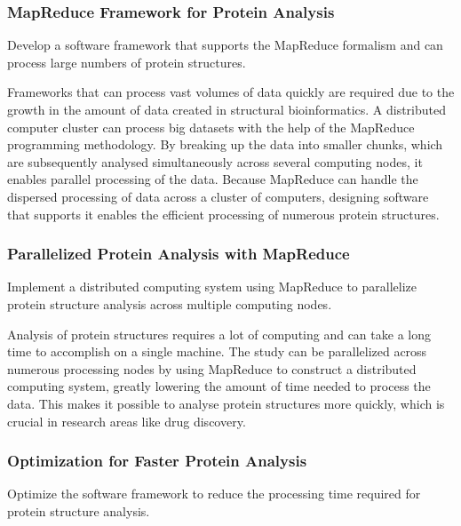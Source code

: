 \documentclass[]{final_report}
\begin{document}
\subsubsection{MapReduce Framework for Protein Analysis}

\begin{displayquote}
    Develop a software framework that supports the MapReduce formalism and can process large numbers of protein structures.
\end{displayquote}

Frameworks that can process vast volumes of data quickly are required due to the growth in the amount of data created in structural bioinformatics. A distributed computer cluster can process big datasets with the help of the MapReduce programming methodology. By breaking up the data into smaller chunks, which are subsequently analysed simultaneously across several computing nodes, it enables parallel processing of the data. Because MapReduce can handle the dispersed processing of data across a cluster of computers, designing software that supports it enables the efficient processing of numerous protein structures.

\subsubsection{Parallelized Protein Analysis with MapReduce}

\begin{displayquote}
    Implement a distributed computing system using MapReduce to parallelize protein structure analysis across multiple computing nodes.
\end{displayquote}

Analysis of protein structures requires a lot of computing and can take a long time to accomplish on a single machine. The study can be parallelized across numerous processing nodes by using MapReduce to construct a distributed computing system, greatly lowering the amount of time needed to process the data. This makes it possible to analyse protein structures more quickly, which is crucial in research areas like drug discovery.

\subsubsection{Optimization for Faster Protein Analysis}

\begin{displayquote}
    Optimize the software framework to reduce the processing time required for protein structure analysis.
\end{displayquote}
\end{document}

